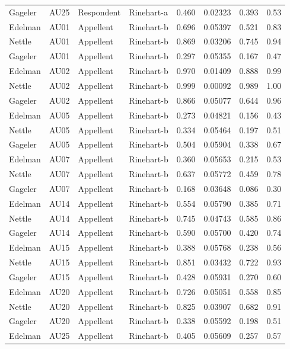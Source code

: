 \documentclass{monashthesis}
\begin{document}
\begin{center}
\begin{longtable}{llllllll}
Gageler & AU25 & Respondent & Rinehart-a & 0.460 & 0.02323 & 0.393 & 0.53 \\
Edelman & AU01 & Appellent & Rinehart-b & 0.696 & 0.05397 & 0.521 & 0.83 \\
Nettle & AU01 & Appellent & Rinehart-b & 0.869 & 0.03206 & 0.745 & 0.94 \\
Gageler & AU01 & Appellent & Rinehart-b & 0.297 & 0.05355 & 0.167 & 0.47 \\
Edelman & AU02 & Appellent & Rinehart-b & 0.970 & 0.01409 & 0.888 & 0.99 \\
Nettle & AU02 & Appellent & Rinehart-b & 0.999 & 0.00092 & 0.989 & 1.00 \\
Gageler & AU02 & Appellent & Rinehart-b & 0.866 & 0.05077 & 0.644 & 0.96 \\
Edelman & AU05 & Appellent & Rinehart-b & 0.273 & 0.04821 & 0.156 & 0.43 \\
Nettle & AU05 & Appellent & Rinehart-b & 0.334 & 0.05464 & 0.197 & 0.51 \\
Gageler & AU05 & Appellent & Rinehart-b & 0.504 & 0.05904 & 0.338 & 0.67 \\
Edelman & AU07 & Appellent & Rinehart-b & 0.360 & 0.05653 & 0.215 & 0.53 \\
Nettle & AU07 & Appellent & Rinehart-b & 0.637 & 0.05772 & 0.459 & 0.78 \\
Gageler & AU07 & Appellent & Rinehart-b & 0.168 & 0.03648 & 0.086 & 0.30 \\
Edelman & AU14 & Appellent & Rinehart-b & 0.554 & 0.05790 & 0.385 & 0.71 \\
Nettle & AU14 & Appellent & Rinehart-b & 0.745 & 0.04743 & 0.585 & 0.86 \\
Gageler & AU14 & Appellent & Rinehart-b & 0.590 & 0.05700 & 0.420 & 0.74 \\
Edelman & AU15 & Appellent & Rinehart-b & 0.388 & 0.05768 & 0.238 & 0.56 \\
Nettle & AU15 & Appellent & Rinehart-b & 0.851 & 0.03432 & 0.722 & 0.93 \\
Gageler & AU15 & Appellent & Rinehart-b & 0.428 & 0.05931 & 0.270 & 0.60 \\
Edelman & AU20 & Appellent & Rinehart-b & 0.726 & 0.05051 & 0.558 & 0.85 \\
Nettle & AU20 & Appellent & Rinehart-b & 0.825 & 0.03907 & 0.682 & 0.91 \\
Gageler & AU20 & Appellent & Rinehart-b & 0.338 & 0.05592 & 0.198 & 0.51 \\
Edelman & AU25 & Appellent & Rinehart-b & 0.405 & 0.05609 & 0.257 & 0.57 \\

\end{longtable}
\end{center}
\end{document}

